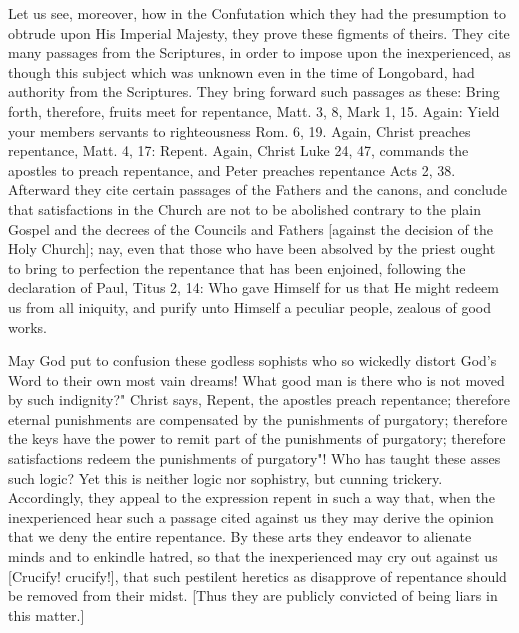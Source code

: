 Let us see, moreover, how in the Confutation which they had the
presumption to obtrude upon His Imperial Majesty, they prove these
figments of theirs.  They cite many passages from the Scriptures, in
order to impose upon the inexperienced, as though this subject which
was unknown even in the time of Longobard, had authority from the
Scriptures.  They bring forward such passages as these: Bring forth,
therefore, fruits meet for repentance, Matt. 3, 8, Mark 1, 15. Again:
Yield your members servants to righteousness Rom. 6, 19. Again,
Christ preaches repentance, Matt. 4, 17: Repent.  Again, Christ Luke
24, 47, commands the apostles to preach repentance, and Peter
preaches repentance Acts 2, 38. Afterward they cite certain passages
of the Fathers and the canons, and conclude that satisfactions in the
Church are not to be abolished contrary to the plain Gospel and the
decrees of the Councils and Fathers [against the decision of the Holy
Church]; nay, even that those who have been absolved by the priest
ought to bring to perfection the repentance that has been enjoined,
following the declaration of Paul, Titus 2, 14: Who gave Himself for
us that He might redeem us from all iniquity, and purify unto Himself
a peculiar people, zealous of good works.

May God put to confusion these godless sophists who so wickedly
distort God's Word to their own most vain dreams!  What good man is
there who is not moved by such indignity?" Christ says, Repent, the
apostles preach repentance; therefore eternal punishments are
compensated by the punishments of purgatory; therefore the keys have
the power to remit part of the punishments of purgatory; therefore
satisfactions redeem the punishments of purgatory"!  Who has taught
these asses such logic?  Yet this is neither logic nor sophistry, but
cunning trickery.  Accordingly, they appeal to the expression repent
in such a way that, when the inexperienced hear such a passage cited
against us they may derive the opinion that we deny the entire
repentance.  By these arts they endeavor to alienate minds and to
enkindle hatred, so that the inexperienced may cry out against us
[Crucify! crucify!], that such pestilent heretics as disapprove of
repentance should be removed from their midst.  [Thus they are
publicly convicted of being liars in this matter.]

